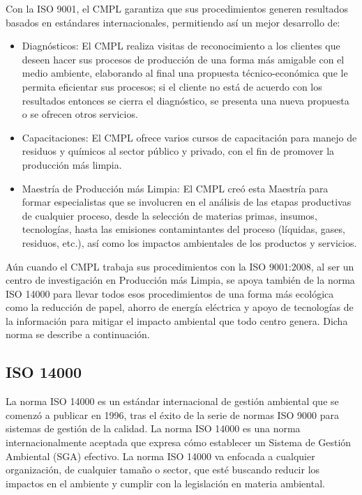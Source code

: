 	Con la ISO 9001, el CMPL garantiza que sus procedimientos generen resultados basados en estándares internacionales, permitiendo así un mejor desarrollo de:\\

	\begin{itemize}
		\item Diagnósticos: El CMPL realiza visitas de reconocimiento a los clientes que deseen hacer sus procesos de producción de una forma más amigable con el medio ambiente, elaborando al final una propuesta técnico-económica que le permita eficientar sus procesos; si el cliente no está de acuerdo con los resultados entonces se cierra el diagnóstico, se presenta una nueva propuesta o se ofrecen otros servicios.
		\item Capacitaciones: El CMPL ofrece varios cursos de capacitación para manejo de residuos y químicos al sector público y privado, con el fin de promover la producción más limpia.
		\item Maestría de Producción más Limpia: El CMPL creó esta Maestría para formar especialistas que se involucren en el análisis de las etapas productivas de cualquier proceso, desde la selección de materias primas, insumos, tecnologías, hasta las emisiones contamintantes del proceso (líquidas, gases, residuos, etc.), así como los impactos ambientales de los productos y servicios. \cite{CMPLWebPage}
	\end{itemize}
	
	Aún cuando el CMPL trabaja sus procedimientos con la ISO 9001:2008, al ser un centro de investigación en Producción más Limpia, se apoya también de la norma ISO 14000 para llevar todos esos procedimientos de una forma más ecológica como la reducción de papel, ahorro de energía eléctrica y apoyo de tecnologías de la información para mitigar el impacto ambiental que todo centro genera. Dicha norma se describe a continuación.
	
	\subsection{ISO 14000}
	La norma ISO 14000 es un estándar internacional de gestión ambiental que se comenzó a publicar en 1996, tras el éxito de la serie de normas ISO 9000 para sistemas de gestión de la calidad. La norma ISO 14000 es una norma internacionalmente aceptada que expresa cómo establecer un Sistema de Gestión Ambiental (SGA) efectivo. La norma ISO 14000 va enfocada a cualquier organización, de cualquier tamaño o sector, que esté buscando reducir los impactos en el ambiente y cumplir con la legislación en materia ambiental.\\
	
